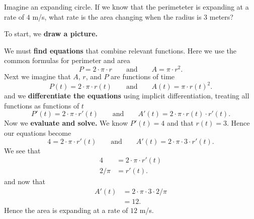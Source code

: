 \documentclass{ximera}
\begin{document}
\begin{example}
  Imagine an expanding circle. If we know that the perimeteter is
  expanding at a rate of $4$ m/s, what rate is the area changing
  when the radius is $3$ meters?
  \begin{explanation}
    To start, we \textbf{draw a picture.}
    \begin{image}
    \end{image}
    We must \textbf{find equations} that combine relevant
    functions. Here we use the common formulas for perimeter and area
    \[
    P = 2\cdot \pi \cdot r
    \qquad\text{and}\qquad
    A = \pi \cdot r^2.
    \]
    Next we imagine that $A$, $r$, and $P$ are functions of time
    \[
    P(t) = 2\cdot \pi \cdot r(t)
    \qquad\text{and}\qquad
    A(t) = \pi \cdot r(t)^2.
    \]
    and we \textbf{differentiate the equations} using implicit
    differentiation, treating all functions as functions of $t$
    \[
    P'(t) = 2\cdot \pi\cdot r'(t)
    \qquad\text{and}\qquad
    A'(t) = 2\cdot \pi\cdot r(t) \cdot r'(t).
    \]
    Now we \textbf{evaluate and solve.} We
    know $P'(t) = 4$ and that $r(t) = 3$. Hence our equations become
    \[
    4 = 2\cdot \pi\cdot r'(t)
    \qquad\text{and}\qquad
    A'(t) = 2\cdot \pi\cdot 3 \cdot r'(t).
    \]
    We see that
    \begin{align*}
      4 &= 2\cdot \pi\cdot r'(t)\\
      2/\pi &= r'(t).
    \end{align*}
    and now that
    \begin{align*}
      A'(t) &= 2\cdot \pi\cdot 3 \cdot 2/\pi\\
      &=12.
    \end{align*}
    Hence the area is expanding at a rate of $12$ m/s.
  \end{explanation}
\end{example}


\end{document}
